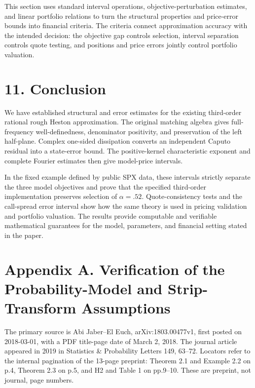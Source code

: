\documentclass[a4paper,11pt]{article}
\begin{document}
This section uses standard interval operations, objective-perturbation estimates, and linear portfolio relations to turn the structural properties and price-error bounds into financial criteria. The criteria connect approximation accuracy with the intended decision: the objective gap controls selection, interval separation controls quote testing, and positions and price errors jointly control portfolio valuation.

\section*{11. Conclusion}

We have established structural and error estimates for the existing third-order rational rough Heston approximation. The original matching algebra gives full-frequency well-definedness, denominator positivity, and preservation of the left half-plane. Complex one-sided dissipation converts an independent Caputo residual into a state-error bound. The positive-kernel characteristic exponent and complete Fourier estimates then give model-price intervals.

In the fixed example defined by public SPX data, these intervals strictly separate the three model objectives and prove that the specified third-order implementation preserves selection of \(\alpha=.52\). Quote-consistency tests and the call-spread error interval show how the same theory is used in pricing validation and portfolio valuation. The results provide computable and verifiable mathematical guarantees for the model, parameters, and financial setting stated in the paper.

\section*{Appendix A. Verification of the Probability-Model and Strip-Transform Assumptions}

The primary source is Abi Jaber–El Euch, arXiv:1803.00477v1, first posted on 2018-03-01, with a PDF title-page date of March 2, 2018. The journal article appeared in 2019 in Statistics \& Probability Letters 149, 63–72. Locators refer to the internal pagination of the 13-page preprint: Theorem 2.1 and Example 2.2 on p.4, Theorem 2.3 on p.5, and H2 and Table 1 on pp.9–10. These are preprint, not journal, page numbers.
\end{document}
